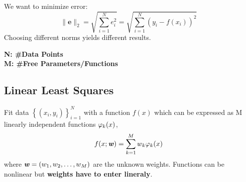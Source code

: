     We want to minimize error:
    \begin{equation*}
        \|\mathbf{e}\|_2=\sqrt{\sum_{i=1}^N e_i^2}=\sqrt{\sum_{i=1}^N (y_i-f(x_i))^2}
    \end{equation*}
    Choosing different norms yields different results.
    
    \textbf{N: \#Data Points \\M: \#Free Parameters/Functions}

\subsection{Linear Least Squares}
    Fit data $\left\{(x_i, y_i)\right\}_{i=1}^{N}$ with a function $f(x)$ which can be expressed as M linearly independent functions $\varphi_k(x)$,
    \begin{equation*}
        f(x;\textbf{\textit{w}}) = \sum_{k=1}^M w_k\varphi_k(x)
    \end{equation*}
    where $\textbf{\textit{w}}=(w_1, w_2, \dots, w_M)$ are the unknown weights.
    Functions can be nonlinear but \textbf{weights have to enter lineraly}.
    
